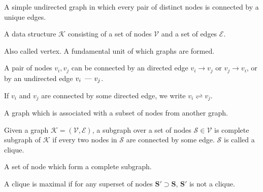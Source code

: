 \DeclareMathOperator*{\undedge}{\mbox{~---\,}}


{%
  A simple undirected \gls{graph} in which every pair of distinct \glspl{node} is connected by a unique \glspl{edge}.
}

{%
  A data structure $\mathcal{K}$ consisting of a set of \glspl{node} $\mathcal{V}$ and a set of \glspl{edge} $\mathcal{E}$.
}

{%
  Also called vertex. A fundamental unit of which graphs are formed.
}

{%
  A pair of \glspl{node} $v_i,v_j$ can be connected by an directed edge $v_i\to v_j$ or $v_j\to v_i$, or by an undirected edge $v_i\undedge v_j$.

  If $v_i$ and $v_j$ are connected by some directed edge, we write $v_i\rightleftharpoons v_j$.
}

{%
  A \gls{graph} which is associated with a subset of \glspl{node} from another \gls{graph}.
}

{%
  Given a graph $\mathcal{K}=(\mathcal{V},\mathcal{E})$, a \gls{subgraph} over a set of \glspl{node} $\mathcal{S}\in \mathcal{V}$ is complete subgraph of $\mathcal{K}$ if every two \glspl{node} in $\mathcal{S}$ are connected by some \gls{edge}. $\mathcal{S}$ is called a \gls{clique}.
}

{%
  A set of \gls{node} which form a \gls{complete subgraph}.
}

{%
  A clique is maximal if for any superset of \glspl{node} $\bm{S'}\supset\bm{S}$, $\bm{S'}$ is not a clique.
}

